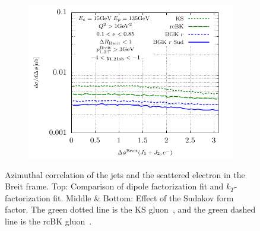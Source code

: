 \documentclass[11pt]{article}
\begin{document}
\begin{figure}[p]
\begin{subfigure}{0.5\textwidth}
	\includegraphics[width=\textwidth]{plots/plotBGK3}
	\end{subfigure}
	\caption{ Azimuthal correlation of the jets and the scattered electron in the Breit frame. Top: Comparison of dipole factorization fit and $k_T$-factorization fit. Middle \& Bottom: Effect of the Sudakov form factor. The green dotted line is the KS gluon~\cite{vanHameren:2021sqc}, and the green dashed line is the rcBK gluon~\cite{Hentschinski:2022rsa}.}
	\label{fig:je-breit}
\end{figure}
\end{document}
